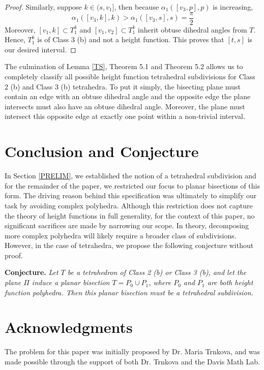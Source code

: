 \documentclass{mainresearch}
\begin{document}
\begin{proof}
	Similarly, suppose $k\in (s,v_1]$, then because $\alpha_{1}([v_3,p],p)$ is increasing, 
	\[
	\alpha_{1}([v_3,k],k) > \alpha_{1}([v_3,s],s) = \frac{\pi}{2}
	\]
	Moreover, $[v_1,k]\subset T_1^k$ and $[v_1,v_2]\subset T_1^k$ inherit obtuse dihedral angles from $T$. Hence, $T_1^k$ is of Class 3 (b) and not a height function. This proves that $[t,s]$ is our desired interval.
\end{proof}

The culmination of Lemma \ref{TS}, Theorem 5.1 and Theorem 5.2 allows us to completely classify all possible height function tetrahedral subdivisions for Class 2 (b) and Class 3 (b) tetrahedra. To put it simply, the bisecting plane must contain an edge with an obtuse dihedral angle and the opposite edge the plane intersects must also have an obtuse dihedral angle. Moreover, the plane must intersect this opposite edge at exactly one point within a non-trivial interval.


\section{Conclusion and Conjecture}
In Section \ref{PRELIM}, we established the notion of a tetrahedral subdivision and for the remainder of the paper, we restricted our focus to planar bisections of this form. The driving reason behind this specification was ultimately to simplify our task by avoiding complex polyhedra. Although this restriction does not capture the theory of height functions in full generality, for the context of this paper, no significant sacrifices are made by narrowing our scope. In theory, decomposing more complex polyhedra will likely require a broader class of subdivisions. However, in the case of tetrahedra, we propose the following conjecture without proof. 

\bigskip

	\noindent\textbf{Conjecture.} \textit{Let $T$ be a tetrahedron of Class 2 (b) or Class 3 (b), and let the plane $\Pi$ induce a planar bisection $T = P_0\cup P_1$, where $P_0$ and $P_1$ are both height function polyhedra. Then this planar bisection must be a tetrahedral subdivision. }
	
\section*{Acknowledgments}
The problem for this paper was initially proposed by Dr. Maria Trnkova, and was made possible through the support of both Dr. Trnkova and the Davis Math Lab.
\end{document}
